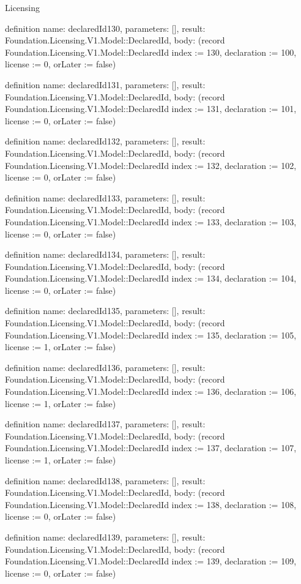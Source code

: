 \begin{lexlean}{Licensing}
\begin{semanticmodule}
definition{
  name: declaredId130,
  parameters: [],
  result: Foundation.Licensing.V1.Model::DeclaredId,
  body: (record Foundation.Licensing.V1.Model::DeclaredId {index := 130, declaration := 100, license := 0, orLater := false})
}

definition{
  name: declaredId131,
  parameters: [],
  result: Foundation.Licensing.V1.Model::DeclaredId,
  body: (record Foundation.Licensing.V1.Model::DeclaredId {index := 131, declaration := 101, license := 0, orLater := false})
}

definition{
  name: declaredId132,
  parameters: [],
  result: Foundation.Licensing.V1.Model::DeclaredId,
  body: (record Foundation.Licensing.V1.Model::DeclaredId {index := 132, declaration := 102, license := 0, orLater := false})
}

definition{
  name: declaredId133,
  parameters: [],
  result: Foundation.Licensing.V1.Model::DeclaredId,
  body: (record Foundation.Licensing.V1.Model::DeclaredId {index := 133, declaration := 103, license := 0, orLater := false})
}

definition{
  name: declaredId134,
  parameters: [],
  result: Foundation.Licensing.V1.Model::DeclaredId,
  body: (record Foundation.Licensing.V1.Model::DeclaredId {index := 134, declaration := 104, license := 0, orLater := false})
}

definition{
  name: declaredId135,
  parameters: [],
  result: Foundation.Licensing.V1.Model::DeclaredId,
  body: (record Foundation.Licensing.V1.Model::DeclaredId {index := 135, declaration := 105, license := 1, orLater := false})
}

definition{
  name: declaredId136,
  parameters: [],
  result: Foundation.Licensing.V1.Model::DeclaredId,
  body: (record Foundation.Licensing.V1.Model::DeclaredId {index := 136, declaration := 106, license := 1, orLater := false})
}

definition{
  name: declaredId137,
  parameters: [],
  result: Foundation.Licensing.V1.Model::DeclaredId,
  body: (record Foundation.Licensing.V1.Model::DeclaredId {index := 137, declaration := 107, license := 1, orLater := false})
}

definition{
  name: declaredId138,
  parameters: [],
  result: Foundation.Licensing.V1.Model::DeclaredId,
  body: (record Foundation.Licensing.V1.Model::DeclaredId {index := 138, declaration := 108, license := 0, orLater := false})
}

definition{
  name: declaredId139,
  parameters: [],
  result: Foundation.Licensing.V1.Model::DeclaredId,
  body: (record Foundation.Licensing.V1.Model::DeclaredId {index := 139, declaration := 109, license := 0, orLater := false})
}


\end{semanticmodule}
\end{lexlean}
